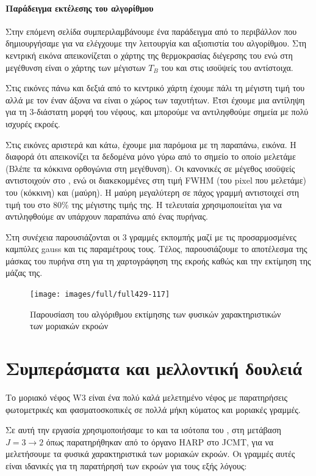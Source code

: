 \documentclass[a4paper,12pt]{memoir}
\begin{document}
\subsubsection{Παράδειγμα εκτέλεσης του αλγορίθμου}
Στην επόμενη σελίδα συμπεριλαμβάνουμε ένα παράδειγμα από το περιβάλλον που δημιουργήσαμε για να ελέγχουμε την λειτουργία και αξιοπιστία του αλγορίθμου. Στη κεντρική εικόνα απεικονίζεται ο χάρτης της θερμοκρασίας διέγερσης του 
ενώ στη μεγέθυνση είναι ο χάρτης των μέγιστων $T_B$ του  και στις ισοϋψείς του  αντίστοιχα.

Στις εικόνες πάνω και δεξιά από το κεντρικό χάρτη έχουμε πάλι τη μέγιστη τιμή του  αλλά με τον έναν άξονα να είναι ο χώρος των ταχυτήτων. Έτσι έχουμε μια αντίληψη για τη 3-διάστατη μορφή του νέφους, και μπορούμε να αντιληφθούμε σημεία με πολύ ισχυρές εκροές.

Στις εικόνες αριστερά και κάτω, έχουμε μια παρόμοια με τη παραπάνω, εικόνα. Η διαφορά ότι απεικονίζει τα δεδομένα μόνο γύρω από το σημείο το οποίο μελετάμε (Βλέπε τα κόκκινα ορθογώνια στη μεγέθυνση). Οι κανονικές σε μέγεθος ισοϋψείς αντιστοιχούν στο , ενώ οι διακεκομμένες στη τιμή FWHM (του pixel που μελετάμε) του  (κόκκινη) και  (μαύρη). Η μαύρη μεγαλύτερη σε πάχος γραμμή αντιστοιχεί στη τιμή του  στο 80\% της μέγιστης τιμής της. Η τελευταία χρησιμοποιείται για να αντιληφθούμε αν υπάρχουν παραπάνω από ένας πυρήνας. 

Στη συνέχεια παρουσιάζονται οι 3 γραμμές εκπομπής μαζί με τις προσαρμοσμένες καμπύλες gauss και τις παραμέτρους τους. Τέλος, παρουσιάζουμε το αποτέλεσμα της μάσκας του πυρήνα στη  για τη χαρτογράφηση της εκροής καθώς και την εκτίμηση της μάζας της.

\begin{figure}[h]
	\centering
	\texttt{[image: images/full/full429-117]}
	\caption{Παρουσίαση του αλγόριθμου εκτίμησης των φυσικών χαρακτηριστικών των μοριακών εκροών}
\end{figure}

\chapter{Συμπεράσματα και μελλοντική δουλειά}
Το μοριακό νέφος W3 είναι ένα πολύ καλά μελετημένο νέφος με παρατηρήσεις φωτομετρικές και φασματοσκοπικές σε πολλά μήκη κύματος και μοριακές γραμμές. 

Σε αυτή την εργασία χρησιμοποιήσαμε το  και τα ισότοπα του ,  στη μετάβαση $J=3\to 2$ όπως παρατηρήθηκαν από το όργανο HARP στο JCMT, για να μελετήσουμε τα φυσικά χαρακτηριστικά των μοριακών εκροών. Οι γραμμές αυτές είναι ιδανικές για τη παρατήρησή των εκροών για τους εξής λόγους:
\end{document}
